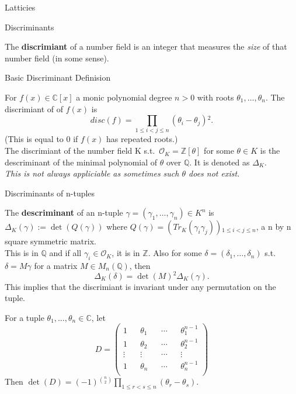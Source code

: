 \documentclass[12pt, letterpaper]{article}
\newcommand{\C}{\mathbb{C}}
\newcommand{\Q}{\mathbb{Q}}
\newcommand{\Z}{\mathbb{Z}}
\newcommand{\Ok}{\mathcal{O}}
\begin{document}
\begin{section}{Latticies}

  \begin{subsection}{Discriminants}

    The \textbf{discrimiant} of a number field is an integer that measures the
    \textit{size} of that number field (in some sense).

    \begin{subsubsection}{Basic Discriminant Definision}

      For \(f(x) \in \C[x]\) a monic polynomial degree \(n > 0\) with roots
      \(\theta_{1}, \dots , \theta_{n}\). The discrimiant of of \(f(x)\) is
      \[disc(f) = \prod_{1 \leq i < j \leq n}
        (\theta_{i} - \theta_{j}){}^{2}.\] (This is equal to 0 if \(f(x)\) has
      repeated  roots.) \\
      The discrimiant of the number field K s.t.\ \(\Ok_{K} = \Z[\theta]\) for
      some \(\theta \in K\) is the descriminant of the minimal polynomial of
      \(\theta\) over \(\Q\). It is denoted as \(\Delta_{K}\). \\
      \textit{This is not always appliciable as sometimes such \(\theta\) does
        not exist.}

    \end{subsubsection}

    \begin{subsubsection}{Discriminants of n-tuples}

      The \textbf{descriminant} of an n-tuple \(\gamma = (\gamma_{1}, \dots ,
      \gamma_{n}) \in K^{n}\) is \(\Delta_{K}(\gamma) := \det(Q(\gamma))\)
      where \(Q(\gamma) = (Tr_{K}(\gamma_{i} \gamma_{j})
      ){}_{1 \leq i < j \leq n}\), a n by n square symmetric matrix. \\
      This is in \(\Q\) and if all \(\gamma_{i} \in \Ok_{K}\), it is in \(\Z\).
      Also for some \(\delta = (\delta_{1}, \dots , \delta_{n})\) s.t.\
      \(\delta = M \gamma\) for a matrix \(M \in M_{n}(\Q)\), then
      \[\Delta_{K}(\delta) = \det(M){}^{2} \Delta_{K}(\gamma).\] This implies
      that the discrimiant is invariant under any permutation on the tuple.


      For a tuple \(\theta_{1}, \dots , \theta_{n} \in \C\), let
      \[ D =
        \begin{pmatrix}
          1 && \theta_{1} && \cdots && \theta^{n - 1}_{1} \\
          1 && \theta_{2} && \cdots && \theta^{n - 1}_{2} \\
          \vdots && \vdots && \cdots && \vdots \\
          1 && \theta_{n} && \cdots && \theta^{n - 1}_{n} \\
        \end{pmatrix}
      \]
      Then \(\det(D) = (-1){}^{{n}\choose{2}} \prod_{1 \leq r < s \leq n}
      (\theta_{r} - \theta_{s})\).


\end{subsubsection}
\end{subsection}
\end{section}
\end{document}
